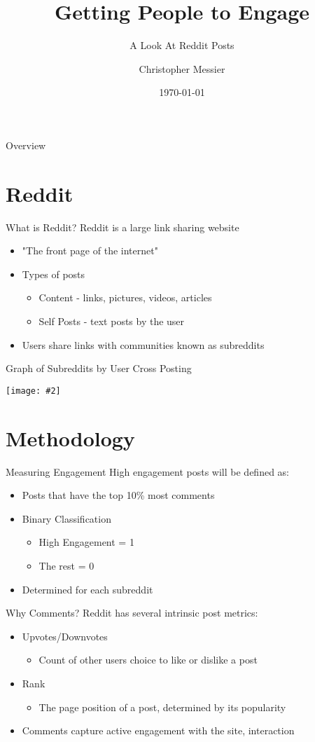 \documentclass[10pt,t]{beamer}
\title[Engagement]{Getting People to Engage}
\subtitle{A Look At Reddit Posts}
\author[Messier]{Christopher Messier}
\institute[GA]{General Assembly\\Washington, D.C.}
\date{\today}
\newcommand{\bi}{\begin{itemize}}                                 %
\newcommand{\ei}{\end{itemize}}                                   %
\newcommand*{\ig}[2]{{\centering\texttt{[image: \#2]}\par}}    %
\begin{document}
\linespread{2}

\begin{frame}
	\titlepage
\end{frame}

\begin{frame}{Overview}
	\tableofcontents
\end{frame}

\section{Reddit}
\begin{frame}{What is Reddit?}
	Reddit is a large link sharing website
	\bi 
		\item "The front page of the internet"
		\item Types of posts
			\bi
				\item Content - links, pictures, videos, articles
				\item Self Posts - text posts by the user
			\ei
		\item Users share links with communities known as subreddits
	\ei 
\end{frame}

\begin{frame}[fragile, c]{Graph of Subreddits by User Cross Posting}
	\ig{width=.75\textwidth}{subreddit_graph.png}
\end{frame}

\section{Methodology}

\begin{frame}{Measuring Engagement}
High engagement posts will be defined as:
	\bi
		\item Posts that have the top 10\% most comments 
		\item Binary Classification
			\bi
				\item High Engagement = 1
				\item The rest = 0
			\ei
		\item Determined for each subreddit

	\ei
\end{frame}

\begin{frame}{Why Comments?}
Reddit has several intrinsic post metrics:
	\bi
		\item Upvotes/Downvotes
			\bi
				\item Count of other users choice to like or dislike a post
			\ei
		\item Rank
			\bi
				\item The page position of a post, determined by its popularity
			\ei
		\item Comments capture active engagement with the site, interaction
	\ei
\end{frame}
\end{document}
